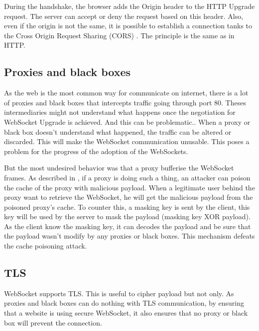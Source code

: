 \documentclass[10pt,journal,compsoc]{IEEEtran}
\newcommand{\ws}{WebSocket}
\begin{document}
During the handshake, the browser adds the Origin header to the HTTP Upgrade request.
The server can accept or deny the request based on this header.
Also, even if the origin is not the same, it is possible to establish a connection tanks to the Cross Origin Request Sharing (CORS) \cite{talkingtoyourself}.
The principle is the same as in HTTP.

\subsection{Proxies and black boxes}
\label{sec:key}
As the web is the most common way for communicate on internet, there is a lot of proxies and black boxes that intercepts traffic going through port 80.
Theses intermediaries might not understand what happens once the negotiation for \ws{} Upgrade is achieved.
And this can be problematic..
When a proxy or black box doesn't understand what happened, the traffic can be altered or discarded.
This will make the \ws{} communication unusable.
This poses a problem for the progress of the adoption of the \ws s.

But the most undesired behavior was that a proxy bufferise the \ws{} frames.
As described in \cite{talkingtoyourself}, if a proxy is doing such a thing, an attacker can poison the cache of the proxy with malicious payload.
When a legitimate user behind the proxy want to retrieve the \ws{}, he will get the malicious payload from the poisoned proxy's cache.
To counter this, a masking key is sent by the client, this key will be used by the server to mask the payload (masking key XOR payload).
As the client know the masking key, it can decodes the payload and be sure that the payload wasn't modify by any proxies or black boxes. 
This mechanism defeats the cache poisoning attack.

\subsection{TLS}
\ws{} supports TLS.
This is useful to cipher payload but not only.
As proxies and black boxes can do nothing with TLS communication, by ensuring that a website is using secure \ws{}, it also ensures that no proxy or black box will prevent the connection.
\end{document}
